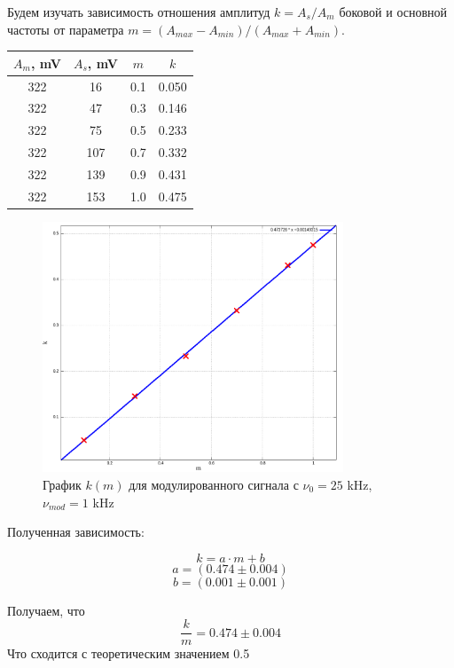 \documentclass{article}
\begin{document}
Будем изучать зависимость отношения амплитуд \( k = A_s/A_m \) боковой и основной частоты от 
параметра \(m = \left(A_{max} - A_{min}\right) / \left(A_{max} + A_{min}\right)\).


\begin{table}[H]
    \centering
    \begin{tabular}{|c|c|c|c|}
        \hline
        \(A_{m}\), mV &  \(A_{s}\), mV & \(m\) & \(k\) \\\hline
        322 & 16  & 0.1 & 0.050 \\\hline
        322 & 47  & 0.3 & 0.146 \\\hline
        322 & 75  & 0.5 & 0.233 \\\hline
        322 & 107 & 0.7 & 0.332 \\\hline
        322 & 139 & 0.9 & 0.431 \\\hline
        322 & 153 & 1.0 & 0.475 \\\hline
        \end{tabular}
\end{table}

\begin{figure}[H]
    \centering
    \includegraphics[width=0.8\textwidth]{mod.png}
    \caption{График \( k(m) \) для модулированного сигнала с \(\nu_0 = 25\) kHz, \(\nu_{mod} = 1\) kHz}
    \label{pic_dnu_tau}
\end{figure}

Полученная зависимость:

\[ k = a\cdot m + b \]
\[ a = (0.474 \pm 0.004) \]
\[ b = (0.001 \pm 0.001)\]

Получаем, что 
\[ \frac{k}{m} = 0.474 \pm 0.004 \]
Что сходится с теоретическим значением 0.5
\end{document}
